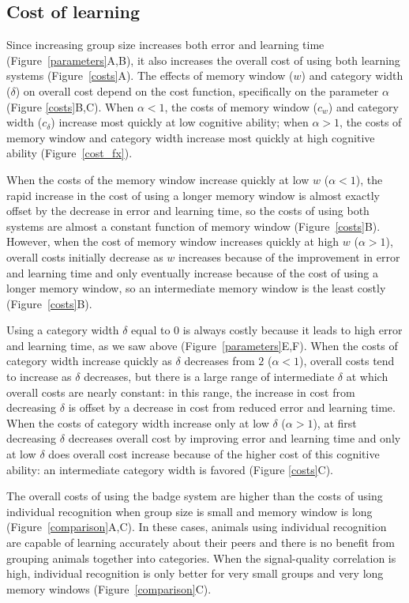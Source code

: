 %
\subsection*{Cost of learning}
% 
Since increasing group size increases both error and learning time (Figure~\ref{parameters}A,B), it also increases the overall cost of using both learning systems (Figure~\ref{costs}A). The effects of memory window ($w$) and category width ($\delta$) on overall cost depend on the cost function, specifically on the parameter $\alpha$ (Figure \ref{costs}B,C). When $\alpha<1$, the costs of memory window ($c_w$) and category width ($c_\delta$) increase most quickly at low cognitive ability; when $\alpha>1$, the costs of memory window and category width increase most quickly at high cognitive ability (Figure~\ref{cost_fx}). 

When the costs of the memory window increase quickly at low $w$ ($\alpha<1$), the rapid increase in the cost of using a longer memory window is almost exactly offset by the decrease in error and learning time, so the costs of using both systems are almost a constant function of memory window (Figure~\ref{costs}B). However, when the cost of memory window increases quickly at high $w$ ($\alpha>1$), overall costs initially decrease as $w$ increases because of the improvement in error and learning time and only eventually increase because of the cost of using a longer memory window, so an intermediate memory window is the least costly (Figure~\ref{costs}B).

Using a category width $\delta$ equal to $0$ is always costly because it leads to high error and learning time, as we saw above (Figure~\ref{parameters}E,F).  When the costs of category width increase quickly as $\delta$ decreases from $2$ ($\alpha<1$), overall costs tend to increase as $\delta$ decreases, but there is a large range of intermediate $\delta$ at which overall costs are nearly constant: in this range, the increase in cost from decreasing $\delta$ is offset by a decrease in cost from reduced error and learning time. When the costs of category width increase only at low $\delta$ ($\alpha>1$), at first decreasing $\delta$ decreases overall cost by improving error and learning time and only at low $\delta$ does overall cost increase because of the higher cost of this cognitive ability: an intermediate category width is favored (Figure \ref{costs}C).

The overall costs of using the badge system are higher than the costs of using individual recognition when group size is small and memory window is long (Figure~\ref{comparison}A,C). In these cases, animals using individual recognition are capable of learning accurately about their peers and there is no benefit from grouping animals together into categories. When the signal-quality correlation is high, individual recognition is only better for very small groups and very long memory windows (Figure~\ref{comparison}C). 

